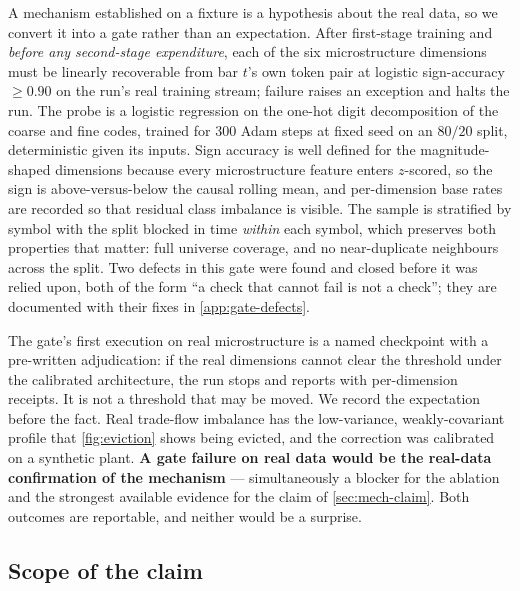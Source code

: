 A mechanism established on a fixture is a hypothesis about the real data, so we convert it into a
gate rather than an expectation. After first-stage training and \emph{before any second-stage
expenditure}, each of the six microstructure dimensions must be linearly recoverable from bar $t$'s
own token pair at logistic sign-accuracy $\geq 0.90$ on the run's real training stream; failure
raises an exception and halts the run.
The probe is a logistic regression on the one-hot digit decomposition of the coarse and fine codes,
trained for $300$ Adam steps at fixed seed on an $80/20$ split, deterministic given its inputs.
Sign accuracy is well defined for the magnitude-shaped dimensions because every microstructure
feature enters $z$-scored, so the sign is above-versus-below the causal rolling mean, and
per-dimension base rates are recorded so that residual class imbalance is visible. The sample is
stratified by symbol with the split blocked in time \emph{within} each symbol, which preserves both
properties that matter: full universe coverage, and no near-duplicate neighbours across the split.
Two defects in this gate were found and closed before it was relied upon, both of the form ``a
check that cannot fail is not a check''; they are documented with their fixes in
\cref{app:gate-defects}.

The gate's first execution on real microstructure is a named checkpoint with a pre-written
adjudication: if the real dimensions cannot clear the threshold under the calibrated architecture,
the run stops and reports with per-dimension receipts. It is not a threshold that may be moved.
We record the expectation before the fact. Real trade-flow imbalance has the low-variance,
weakly-covariant profile that \cref{fig:eviction} shows being evicted, and the correction was
calibrated on a synthetic plant. \textbf{A gate failure on real data would be the real-data
confirmation of the mechanism} --- simultaneously a blocker for the ablation and the strongest
available evidence for the claim of \cref{sec:mech-claim}. Both outcomes are reportable, and
neither would be a surprise.

\subsection{Scope of the claim}
\label{sec:mech-scope}

